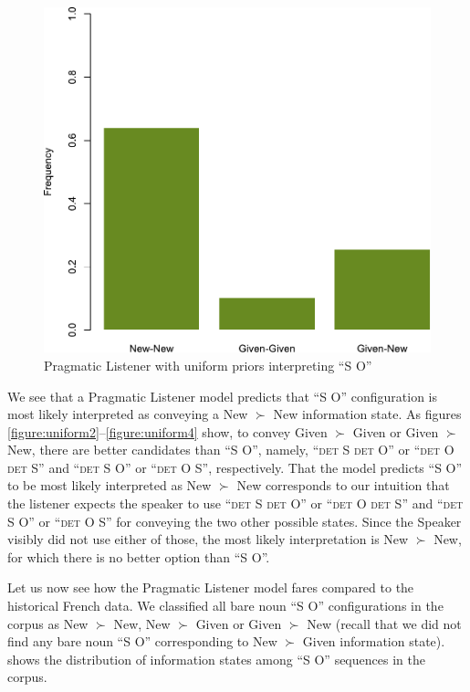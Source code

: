 \documentclass[output=paper,modfonts,nonflat]{langsci/langscibook}
\begin{document}
\begin{figure}
\includegraphics[width=.666\textwidth]{figures/plotPragmaticListenerSbjObjUniform}
\caption{Pragmatic Listener with uniform priors interpreting  ``S O''}\label{figure:uniform5}
\end{figure}

We see that a Pragmatic Listener model predicts that  ``S O'' configuration is most likely interpreted as conveying a New $\succ$ New information state. As figures \ref{figure:uniform2}--\ref{figure:uniform4} show, to convey Given $\succ$ Given or Given $\succ$ New, there are better candidates than  ``S O'', namely,  ``{\scshape det} S {\scshape det} O'' or  ``{\scshape det} O {\scshape det} S'' and  ``{\scshape det} S O'' or  ``{\scshape det} O S'', respectively. That the model predicts  ``S O'' to be most likely interpreted as New $\succ$ New corresponds to our intuition that the listener expects the speaker to use  ``{\scshape det} S {\scshape det} O'' or  ``{\scshape det} O {\scshape det} S'' and  ``{\scshape det} S O'' or  ``{\scshape det} O S'' for conveying the two other possible states. Since the Speaker visibly did not use either of those, the most likely interpretation is New $\succ$ New, for which there is no better option than  ``S O''.

Let us now see how the Pragmatic Listener model fares compared to the historical French data. We classified all bare noun  ``S O'' configurations in the corpus as New $\succ$ New, New $\succ$ Given or Given $\succ$ New (recall that we did not find any bare noun  ``S O'' corresponding to New $\succ$ Given information state).   shows the distribution of information states among  ``S O'' sequences in the corpus.
\end{document}

